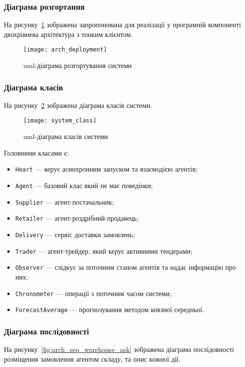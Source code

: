 \subsubsection{Діаграма розгортання}
На рисунку~\ref{fig:arch_deployment} зображена запропонована для реалізації у програмній компоненті двохрівнева архітектура з тонким клієнтом.

\begin{figure}[H]
	\centering
	\texttt{[image: arch\_deployment]}
	\caption{\acrshort{uml}-діаграма розгортування системи}
	\label{fig:arch_deployment}
\end{figure} 

\subsubsection{Діаграма класів}
На рисунку~\ref{fig:system_class} зображена діаграма класів системи.

\begin{figure}[H]
	\centering
	\texttt{[image: system\_class]}
	\caption{\acrshort{uml}-діаграма класів системи}
	\label{fig:system_class}
\end{figure} 

Головними класами є:
\begin{itemize}
	\item \texttt{Heart} --- керує асинхронним запуском та взаємодією агентів;
	\item \texttt{Agent} --- базовий клас який не має поведінки;
	\item \texttt{Supplier} --- агент-постачальник;
	\item \texttt{Retailer} --- агент-роздрібний-продавець;
	\item \texttt{Delivery} --- сервіс доставки замовлень;
	\item \texttt{Trader} --- агент-трейдер, який керує активними тендерами;
	\item \texttt{Observer} --- слідкує за поточним станом агентів та надає інформацію про них;
	\item \texttt{Chronometer} --- операції з поточним часом системи;
	\item \texttt{ForecastAverage} --- прогнозування методом ковзної середньої.
\end{itemize}

\subsubsection{Діаграма послідовності}
На рисунку~\ref{fig:arch_seq_warehouse_ask} зображена діаграма послідовності розміщення замовлення агентом складу, та опис кожної дії.

